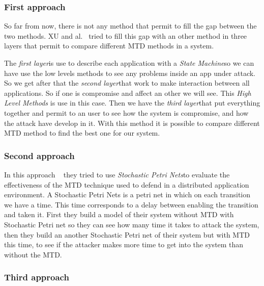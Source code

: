 \subsubsection{ First approach}

So far from now, there is not any method that permit to fill the gap
between the two methods. XU and al.~\cite{xu_2014} tried to fill this gap
with an other method in three layers that permit to compare different
MTD methods in a system.

The \emph{first layer}is use to describe each application with a \emph{State
Machine}so we can have use the low levels methods to see any
problems inside an app under attack. So we get after that the \emph{second
layer}that work to make interaction between all applications. So if
one is compromise and affect an other we will see. This \emph{High Level Methods}
is use in this case. Then we have the \emph{third layer}that put
everything together and permit to an user to see how the system is
compromise, and how the attack have develop in it. \newline 
With this method it is possible to compare different MTD method to
find the best one for our system.


\subsubsection{ Second approach }

In this approach ~\cite{moody_2014} they tried to use \emph{Stochastic Petri
Nets}to evaluate the effectiveness of the MTD technique used to
defend in a distributed application environment. A Stochastic Petri
Nets is a petri net in which on each transition we have a time. This
time corresponds to a delay between enabling the transition and taken
it. \newline First they build a model of their system without MTD with
Stochastic Petri net so they can see how many time it takes to attack
the system, then they build an another Stochastic Petri net of their
system but with MTD this time, to see if the attacker makes more time
to get into the system than without the MTD.


\subsubsection{ Third approach }

